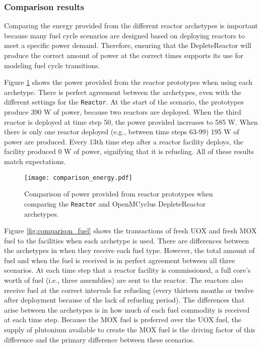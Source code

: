 \subsubsection{Comparison results}
Comparing the energy provided from the different reactor archetypes is 
important because many 
fuel cycle scenarios are designed based on deploying reactors to meet a 
specific power demand. Therefore, ensuring that the DepleteReactor 
will produce the correct amount of power at the correct times 
supports its use for modeling fuel cycle transitions. 

Figure \ref{fig:comparison_power} shows the power provided from the
reactor prototypes when using each archetype.
There is perfect agreement between the archetypes, even with the different 
settings for the \Cycamore \texttt{Reactor}. At the start of the scenario, 
the prototypes produce 390 W of power, because two reactors are 
deployed. When the third reactor is deployed at time step 50, 
the power provided increases to 585 W. When there is only one  
reactor deployed (e.g., between time steps 63-99) 195 W of power 
are produced. Every 13th time step after a reactor facility deploys, 
the facility produced 0 W of power, signifying that it is refueling.
All of these results match expectations. 

\begin{figure}[ht]
    \centering 
    \texttt{[image: comparison\_energy.pdf]}
    \caption{Comparison of power provided from reactor prototypes 
    when comparing the \Cycamore \texttt{Reactor} and OpenMCyclus 
    DepleteReactor archetypes.}
    \label{fig:comparison_power}
\end{figure}

Figure \ref{fig:comparison_fuel} shows the transactions of fresh UOX 
and fresh MOX fuel to the facilities when each archetype is used. There are 
differences between the archetypes in when they receive each fuel type. 
However, the total amount of fuel and when the fuel is received is in 
perfect agreement between all three scenarios. At each time step that 
a reactor facility is commissioned, a full core's worth of fuel (i.e., 
three assemblies) are sent to the reactor. The reactors also receive fuel 
at the correct intervals for refueling (every thirteen months or twelve 
after deployment because of the lack of refueling period). The differences 
that arise between the archetypes is in how much of each fuel commodity 
is received at each time step. Because the \gls{MOX} fuel is preferred 
over the \gls{UOX} fuel, the supply of plutonium available to create the 
\gls{MOX} fuel is the driving factor of this difference and the primary 
difference between these scenarios. 

